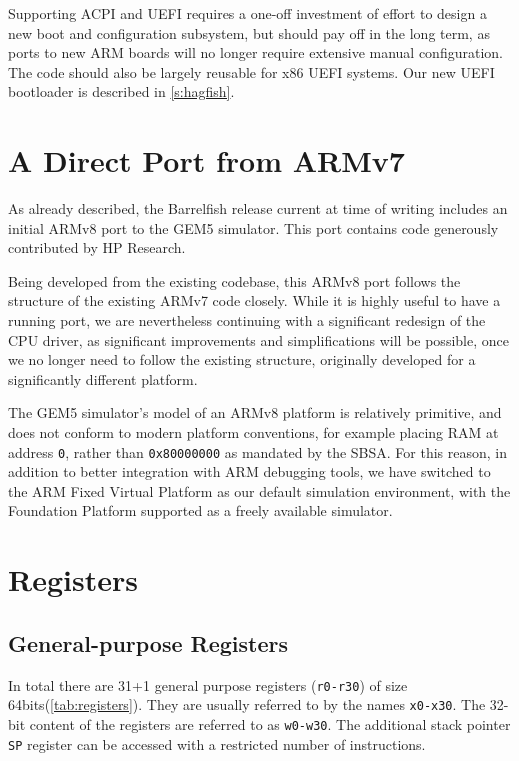 \documentclass[a4paper,twoside]{report}
\begin{document}
Supporting ACPI and UEFI requires a one-off investment of effort to design a
new boot and configuration subsystem, but should pay off in the long term, as
ports to new ARM boards will no longer require extensive manual configuration.
The code should also be largely reusable for x86 UEFI systems. Our new UEFI
bootloader is described in \autoref{s:hagfish}.

\section{A Direct Port from ARMv7}

As already described, the Barrelfish release current at time of writing
includes an initial ARMv8 port to the GEM5 simulator. This port contains code
generously contributed by HP Research.

Being developed from the existing codebase, this ARMv8 port follows the
structure of the existing ARMv7 code closely. While it is highly useful to
have a running port, we are nevertheless continuing with a significant
redesign of the CPU driver, as significant improvements and simplifications
will be possible, once we no longer need to follow the existing structure,
originally developed for a significantly different platform.

The GEM5 simulator's model of an ARMv8 platform is relatively primitive, and
does not conform to modern platform conventions, for example placing RAM at
address \texttt{0}, rather than \texttt{0x80000000} as mandated by the SBSA.
For this reason, in addition to better integration with ARM debugging tools,
we have switched to the ARM Fixed Virtual Platform as our default simulation
environment, with the Foundation Platform supported as a freely available
simulator.

\section{Registers}

\subsection{General-purpose Registers}

In total there are 31+1 general purpose registers (\texttt{r0-r30}) of size 
64bits(\autoref{tab:registers}). They are usually referred to by the names 
\texttt{x0-x30}. The 32-bit content of the registers are referred to as 
\texttt{w0-w30}. The additional stack pointer \texttt{SP} register can be 
accessed with a restricted number of instructions.
\end{document}
